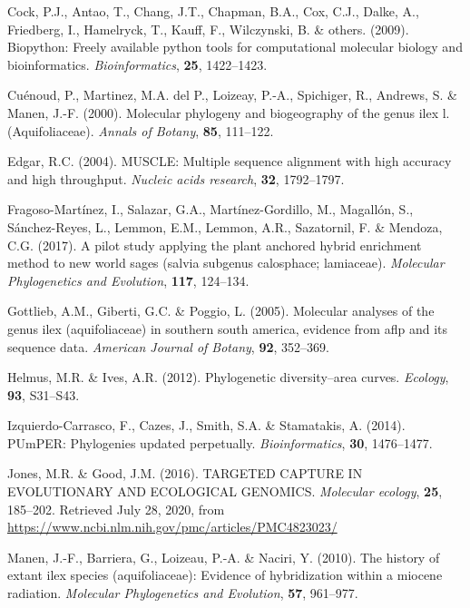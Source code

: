 \documentclass[]{article}
\begin{document}
\leavevmode\hypertarget{ref-cock2009biopython}{}%
Cock, P.J., Antao, T., Chang, J.T., Chapman, B.A., Cox, C.J., Dalke, A., Friedberg, I., Hamelryck, T., Kauff, F., Wilczynski, B. \& others. (2009). Biopython: Freely available python tools for computational molecular biology and bioinformatics. \emph{Bioinformatics}, \textbf{25}, 1422--1423.

\leavevmode\hypertarget{ref-cuenoud2000molecular}{}%
Cuénoud, P., Martinez, M.A. del P., Loizeay, P.-A., Spichiger, R., Andrews, S. \& Manen, J.-F. (2000). Molecular phylogeny and biogeography of the genus ilex l.(Aquifoliaceae). \emph{Annals of Botany}, \textbf{85}, 111--122.

\leavevmode\hypertarget{ref-edgar2004muscle}{}%
Edgar, R.C. (2004). MUSCLE: Multiple sequence alignment with high accuracy and high throughput. \emph{Nucleic acids research}, \textbf{32}, 1792--1797.

\leavevmode\hypertarget{ref-fragoso2017pilot}{}%
Fragoso-Martínez, I., Salazar, G.A., Martínez-Gordillo, M., Magallón, S., Sánchez-Reyes, L., Lemmon, E.M., Lemmon, A.R., Sazatornil, F. \& Mendoza, C.G. (2017). A pilot study applying the plant anchored hybrid enrichment method to new world sages (salvia subgenus calosphace; lamiaceae). \emph{Molecular Phylogenetics and Evolution}, \textbf{117}, 124--134.

\leavevmode\hypertarget{ref-gottlieb2005molecular}{}%
Gottlieb, A.M., Giberti, G.C. \& Poggio, L. (2005). Molecular analyses of the genus ilex (aquifoliaceae) in southern south america, evidence from aflp and its sequence data. \emph{American Journal of Botany}, \textbf{92}, 352--369.

\leavevmode\hypertarget{ref-helmus2012phylogenetic}{}%
Helmus, M.R. \& Ives, A.R. (2012). Phylogenetic diversity--area curves. \emph{Ecology}, \textbf{93}, S31--S43.

\leavevmode\hypertarget{ref-izquierdo2014pumper}{}%
Izquierdo-Carrasco, F., Cazes, J., Smith, S.A. \& Stamatakis, A. (2014). PUmPER: Phylogenies updated perpetually. \emph{Bioinformatics}, \textbf{30}, 1476--1477.

\leavevmode\hypertarget{ref-jones2016targeted}{}%
Jones, M.R. \& Good, J.M. (2016). TARGETED CAPTURE IN EVOLUTIONARY AND ECOLOGICAL GENOMICS. \emph{Molecular ecology}, \textbf{25}, 185--202. Retrieved July 28, 2020, from \url{https://www.ncbi.nlm.nih.gov/pmc/articles/PMC4823023/}

\leavevmode\hypertarget{ref-manen2010history}{}%
Manen, J.-F., Barriera, G., Loizeau, P.-A. \& Naciri, Y. (2010). The history of extant ilex species (aquifoliaceae): Evidence of hybridization within a miocene radiation. \emph{Molecular Phylogenetics and Evolution}, \textbf{57}, 961--977.
\end{document}
